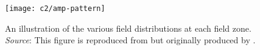 %
%
\begin{figure}[H] %
	    \centering	
	    \texttt{[image: c2/amp-pattern]}	   	   
	    \caption{An illustration of the various field distributions at each field zone. \emph{Source}: This figure  is reproduced from  \citep[pg. 35]{Balanis2005} 
	    but originally produced by \citep{482029}.}
	    \label{fig:amp-pattern}
       \end{figure}
  \FloatBarrier   



%
